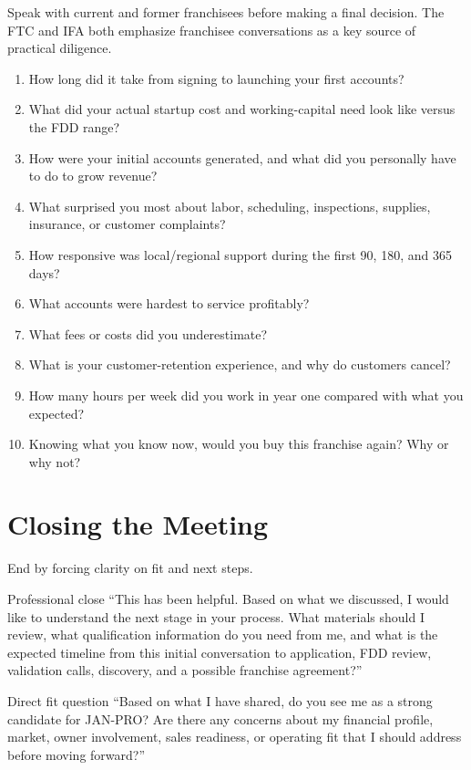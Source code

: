 \documentclass[11pt]{article}
\newcommand{\janpro}{JAN-PRO}
\begin{document}
Speak with current and former franchisees before making a final decision. The FTC and IFA both emphasize franchisee conversations as a key source of practical diligence.\cite{ftc-consumer-guide,ftc-deep-dive,ifa-diligence}

\begin{enumerate}
  \item How long did it take from signing to launching your first accounts?
  \item What did your actual startup cost and working-capital need look like versus the FDD range?
  \item How were your initial accounts generated, and what did you personally have to do to grow revenue?
  \item What surprised you most about labor, scheduling, inspections, supplies, insurance, or customer complaints?
  \item How responsive was local/regional support during the first 90, 180, and 365 days?
  \item What accounts were hardest to service profitably?
  \item What fees or costs did you underestimate?
  \item What is your customer-retention experience, and why do customers cancel?
  \item How many hours per week did you work in year one compared with what you expected?
  \item Knowing what you know now, would you buy this franchise again? Why or why not?
\end{enumerate}

\section{Closing the Meeting}

End by forcing clarity on fit and next steps.

\begin{scriptbox}{Professional close}
``This has been helpful. Based on what we discussed, I would like to understand the next stage in your process. What materials should I review, what qualification information do you need from me, and what is the expected timeline from this initial conversation to application, FDD review, validation calls, discovery, and a possible franchise agreement?''
\end{scriptbox}

\begin{scriptbox}{Direct fit question}
``Based on what I have shared, do you see me as a strong candidate for \janpro{}? Are there any concerns about my financial profile, market, owner involvement, sales readiness, or operating fit that I should address before moving forward?''
\end{scriptbox}
\end{document}
